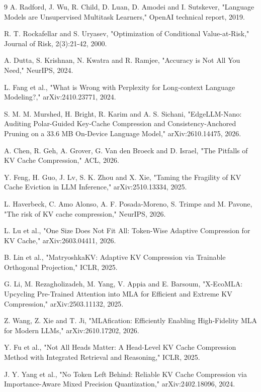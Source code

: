 \documentclass[10pt]{article}
\begin{document}
\begin{thebibliography}{9}
 A. Radford, J. Wu, R. Child, D. Luan, D. Amodei and I. Sutskever, "Language Models are Unsupervised Multitask Learners," OpenAI technical report, 2019.

 R. T. Rockafellar and S. Uryasev, "Optimization of Conditional Value-at-Risk," Journal of Risk, 2(3):21-42, 2000.

 A. Dutta, S. Krishnan, N. Kwatra and R. Ramjee, "Accuracy is Not All You Need," NeurIPS, 2024.

 L. Fang et al., "What is Wrong with Perplexity for Long-context Language Modeling?," arXiv:2410.23771, 2024.

 S. M. M. Murshed, H. Bright, R. Karim and A. S. Sichani, "EdgeLLM-Nano: Auditing Polar-Guided Key-Cache Compression and Consistency-Anchored Pruning on a 33.6 MB On-Device Language Model," arXiv:2610.14475, 2026.

 A. Chen, R. Geh, A. Grover, G. Van den Broeck and D. Israel, "The Pitfalls of KV Cache Compression," ACL, 2026.

 Y. Feng, H. Guo, J. Lv, S. K. Zhou and X. Xie, "Taming the Fragility of KV Cache Eviction in LLM Inference," arXiv:2510.13334, 2025.

 L. Haverbeck, C. Amo Alonso, A. F. Posada-Moreno, S. Trimpe and M. Pavone, "The risk of KV cache compression," NeurIPS, 2026.

 L. Lu et al., "One Size Does Not Fit All: Token-Wise Adaptive Compression for KV Cache," arXiv:2603.04411, 2026.

 B. Lin et al., "MatryoshkaKV: Adaptive KV Compression via Trainable Orthogonal Projection," ICLR, 2025.

 G. Li, M. Rezagholizadeh, M. Yang, V. Appia and E. Barsoum, "X-EcoMLA: Upcycling Pre-Trained Attention into MLA for Efficient and Extreme KV Compression," arXiv:2503.11132, 2025.

 Z. Wang, Z. Xie and T. Ji, "MLAfication: Efficiently Enabling High-Fidelity MLA for Modern LLMs," arXiv:2610.17202, 2026.

 Y. Fu et al., "Not All Heads Matter: A Head-Level KV Cache Compression Method with Integrated Retrieval and Reasoning," ICLR, 2025.

 J. Y. Yang et al., "No Token Left Behind: Reliable KV Cache Compression via Importance-Aware Mixed Precision Quantization," arXiv:2402.18096, 2024.


\end{thebibliography}
\end{document}
